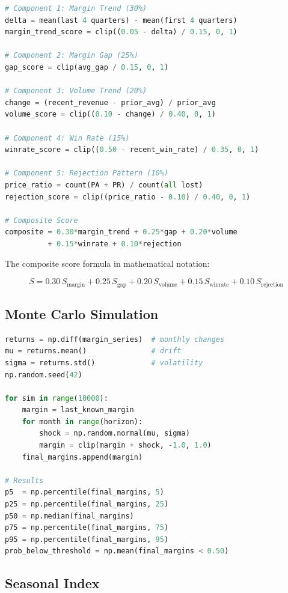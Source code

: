 \documentclass[11pt,a4paper]{article}
\begin{document}
\begin{lstlisting}[language=Python]
# Component 1: Margin Trend (30%)
delta = mean(last 4 quarters) - mean(first 4 quarters)
margin_trend_score = clip((0.05 - delta) / 0.15, 0, 1)

# Component 2: Margin Gap (25%)
gap_score = clip(avg_gap / 0.15, 0, 1)

# Component 3: Volume Trend (20%)
change = (recent_revenue - prior_avg) / prior_avg
volume_score = clip((0.10 - change) / 0.40, 0, 1)

# Component 4: Win Rate (15%)
winrate_score = clip((0.50 - recent_win_rate) / 0.35, 0, 1)

# Component 5: Rejection Pattern (10%)
price_ratio = count(PA + PR) / count(all lost)
rejection_score = clip((price_ratio - 0.10) / 0.40, 0, 1)

# Composite Score
composite = 0.30*margin_trend + 0.25*gap + 0.20*volume
          + 0.15*winrate + 0.10*rejection
\end{lstlisting}

The composite score formula in mathematical notation:

\[
S = 0.30\,S_{\text{margin}} + 0.25\,S_{\text{gap}} + 0.20\,S_{\text{volume}} + 0.15\,S_{\text{winrate}} + 0.10\,S_{\text{rejection}}
\]

\subsection{Monte Carlo Simulation}

\begin{lstlisting}[language=Python]
returns = np.diff(margin_series)  # monthly changes
mu = returns.mean()               # drift
sigma = returns.std()             # volatility
np.random.seed(42)

for sim in range(10000):
    margin = last_known_margin
    for month in range(horizon):
        shock = np.random.normal(mu, sigma)
        margin = clip(margin + shock, -1.0, 1.0)
    final_margins.append(margin)

# Results
p5  = np.percentile(final_margins, 5)
p25 = np.percentile(final_margins, 25)
p50 = np.median(final_margins)
p75 = np.percentile(final_margins, 75)
p95 = np.percentile(final_margins, 95)
prob_below_threshold = np.mean(final_margins < 0.50)
\end{lstlisting}

\subsection{Seasonal Index}
\end{document}
